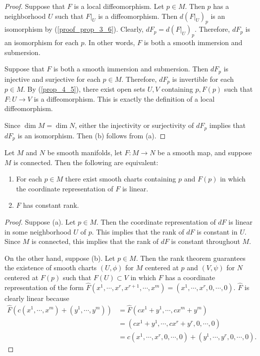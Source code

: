\begin{proof}
  Suppose that $F$ is a local diffeomorphism.
  Let $p \in M$.
  Then $p$ has a neighborhood $U$ such that $F\vert_U$ is a diffeomorphism.
  Then $d(F\vert_U)_p$ is an isomorphism by (\ref{proof_prop_3_6}).
  Clearly, $dF_p = d(F\vert_U)_p$.
  Therefore, $dF_p$ is an isomorphism for each $p$.
  In other words, $F$ is both a smooth immersion and submersion.

  Suppose that $F$ is both a smooth immersion and submersion.
  Then $dF_p$ is injective and surjective for each $p \in M$.
  Therefore, $dF_p$ is invertible for each $p \in M$.
  By (\ref{prop_4_5}), there exist open sets $U, V$ containing $p, F(p)$ such that $F:U \rightarrow V$ is a diffeomorphism.
  This is exactly the definition of a local diffeomorphism.

  Since $\dim M = \dim N$, either the injectivity or surjectivity of $dF_p$ implies that $dF_p$ is an isomorphism.
  Then (b) follows from (a).
\end{proof}

\begin{customthm}{4.13}
  Let $M$ and $N$ be smooth manifolds, let $F: M \rightarrow N$ be a smooth map, and suppose $M$ is connected.
  Then the following are equivalent:
  \begin{enumerate}[label=(\alph*)]
    \item 
      For each $p \in M$ there exist smooth charts containing $p$ and $F(p)$ in which the coordinate representation of $F$ is linear.
    \item
      $F$ has constant rank.
  \end{enumerate}
\end{customthm}

\begin{proof}
  Suppose (a).
  Let $p \in M$.
  Then the coordinate representation of $dF$ is linear in some neighborhood $U$ of $p$.
  This implies that the rank of $dF$ is constant in $U$.
  Since $M$ is connected, this implies that the rank of $dF$ is constant throughout $M$.

  On the other hand, suppose (b).
  Let $p \in M$.
  Then the rank theorem guarantees the existence of smooth charts $(U, \phi)$ for $M$ centered at $p$ and $(V, \psi)$ for $N$ centered at $F(p)$ such that $F(U) \subset V$ in which $F$ has a coordinate representation of the form $\hat{F}(x^1, \cdots, x^r, x^{r + 1}, \cdots, x^m) = (x^1, \cdots, x^r, 0, \cdots, 0)$.
  $\hat{F}$ is clearly linear because 
  \begin{align*}
    \hat{F}(c(x^1, \cdots, x^m) + (y^1, \cdots, y^m))
      &= \hat{F}(cx^1 + y^1, \cdots, cx^m + y^m) \\
      &= (cx^1 + y^1, \cdots, cx^r + y^r, 0, \cdots, 0) \\
      &= c(x^1, \cdots, x^r, 0, \cdots, 0) + (y^1, \cdots, y^r, 0, \cdots, 0).
  \end{align*}
\end{proof}
